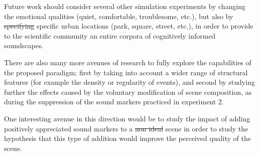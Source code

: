 \documentclass[12pt]{elsarticle}
\newcommand{\etc}{\emph{etc.}}
\providecommand{\DIFadd}[1]{{\protect\color{blue}\uwave{#1}}} %
\providecommand{\DIFdel}[1]{{\protect\color{red}\sout{#1}}}                      %
\providecommand{\DIFaddbegin}{} %
\providecommand{\DIFaddend}{} %
\providecommand{\DIFdelbegin}{} %
\providecommand{\DIFdelend}{} %
\begin{document}
\DIFaddbegin 

\DIFaddend %

Future work should consider several other simulation experiments by changing the emotional qualities (quiet, comfortable, troublesome, etc.), but also by \DIFdelbegin \DIFdel{specifying }\DIFdelend \DIFaddbegin \DIFadd{targeting }\DIFaddend specific urban locations (park, square, street, etc.), in order to provide to the scientific community an entire corpora of cognitively informed soundscapes.

\DIFaddbegin 

\DIFaddend %

There are also many more avenues of research to fully explore the capabilities of the proposed paradigm; first by taking into account a wider range of structural features (for example the density or regularity of events), and second by studying further the effects caused by the voluntary modification of scene composition, as during the suppression of the sound markers practiced in experiment 2.


One interesting avenue in this direction would be to study the impact of adding positively appreciated sound markers to a \DIFdelbegin \DIFdel{non ideal }\DIFdelend \DIFaddbegin \DIFadd{non-ideal }\DIFaddend scene in order to study the hypothesis that this type of addition would improve the perceived quality of the scene.
\end{document}
